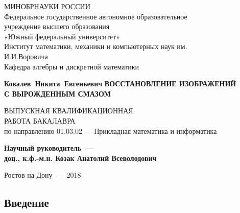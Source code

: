 \documentclass[a4paper]{article}
\renewcommand{\normalsize}{\fontsize{14}{16pt}\selectfont}
\renewcommand{\large}{\fontsize{17}{20pt}\selectfont}
\theoremstyle{definition}
\begin{document}
\normalsize

    \thispagestyle{empty}
    \begin{titlepage}
    \begin{center}


    \vfill
    МИНОБРНАУКИ РОССИИ\\
    \vspace*{0.3cm}
    Федеральное государственное автономное образовательное\\
    учреждение высшего образования\\
    «Южный федеральный университет»\\
    \vspace*{0.3cm}
    Институт математики, механики и компьютерных наук им.\\
    И.И.Воровича\\
    Кафедра алгебры и дискретной математики
    \vfill


    \bigskip


    {\large\bf Ковалев~Никита~Евгеньевич}
    \vfill
    {\large\bf ВОССТАНОВЛЕНИЕ ИЗОБРАЖЕНИЙ\\
               С ВЫРОЖДЕННЫМ СМАЗОМ}

\fontsize{14}{16pt}\selectfont

    \vfill
    ВЫПУСКНАЯ КВАЛИФИКАЦИОННАЯ\\ РАБОТА БАКАЛАВРА\\
    по направлению 01.03.02 — Прикладная математика и информатика
    \vfill

    {\bf Научный руководитель~---\\
         доц., к.ф.-м.н. Козак Анатолий Всеволодович}



    \vfill

    \end{center}

    \bigskip

    \begin{center}
        Ростов-на-Дону~---~2018
    \end{center}

    \end{titlepage}

    \tableofcontents
    \newpage

    \begin{center}
        \section*{Введение}
    \end{center}
\end{document}
